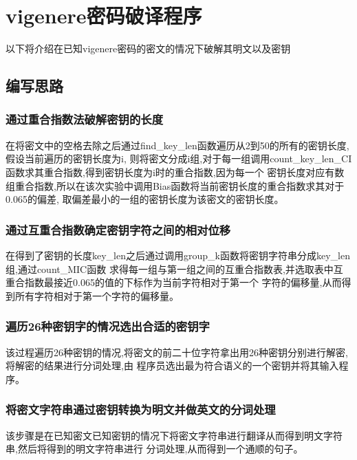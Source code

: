 \section{vigenere密码破译程序}
    以下将介绍在已知vigenere密码的密文的情况下破解其明文以及密钥

\subsection{编写思路}
    \subsubsection{通过重合指数法破解密钥的长度}
        在将密文中的空格去除之后通过find\_key\_len函数遍历从2到50的所有的密钥长度,假设当前遍历的密钥长度为i,
        则将密文分成i组,对于每一组调用count\_key\_len\_CI函数求其重合指数,得到密钥长度为i时的重合指数,因为每一个
        密钥长度对应有数组重合指数,所以在该次实验中调用Bias函数将当前密钥长度的重合指数求其对于0.065的偏差,
        取偏差最小的一组的密钥长度为该密文的密钥长度。\\   

    \subsubsection{通过互重合指数确定密钥字符之间的相对位移}
        在得到了密钥的长度key\_len之后通过调用group\_k函数将密钥字符串分成key\_len组,通过count\_MIC函数
        求得每一组与第一组之间的互重合指数表,并选取表中互重合指数最接近0.065的值的下标作为当前字符相对于第一个
        字符的偏移量,从而得到所有字符相对于第一个字符的偏移量。\\

    \subsubsection{遍历26种密钥字的情况选出合适的密钥字}
        该过程遍历26种密钥的情况,将密文的前二十位字符拿出用26种密钥分别进行解密,将解密的结果进行分词处理,由
        程序员选出最为符合语义的一个密钥并将其输入程序。\\

    \subsubsection{将密文字符串通过密钥转换为明文并做英文的分词处理}
        该步骤是在已知密文已知密钥的情况下将密文字符串进行翻译从而得到明文字符串,然后将得到的明文字符串进行
        分词处理,从而得到一个通顺的句子。\\
\newpage

